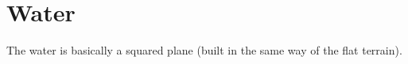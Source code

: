 \section{Water}
The water is basically a squared plane (built in the same way of the flat terrain).

\begin{figure}[hbt!]
	\centering
	\qquad
	\caption{}
\end{figure}